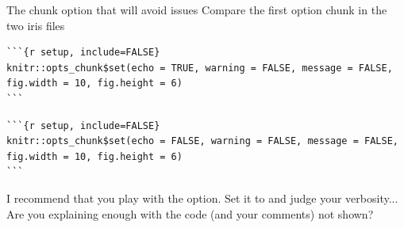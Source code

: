 \documentclass[aspectratio=169]{beamer}\usepackage[]{graphicx}\usepackage[]{xcolor}
\begin{document}
\begin{frame}[fragile]{The chunk option that will avoid issues}
Compare the first option chunk in the two iris files
\vfill
\begin{lstlisting}
```{r setup, include=FALSE}
knitr::opts_chunk$set(echo = TRUE, warning = FALSE, message = FALSE, fig.width = 10, fig.height = 6)
```\end{lstlisting}
\vfill
\begin{lstlisting}
```{r setup, include=FALSE}
knitr::opts_chunk$set(echo = FALSE, warning = FALSE, message = FALSE, fig.width = 10, fig.height = 6)
```\end{lstlisting}
\vfill
I recommend that you play with the  option. Set it to  and judge your verbosity... Are you explaining enough with the code (and your comments) not shown?
\end{frame}
\end{document}
